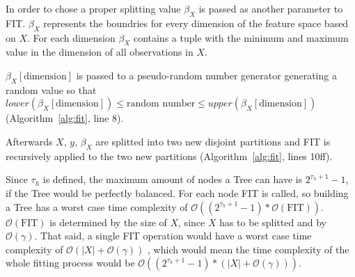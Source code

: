 In order to chose a proper splitting value $\beta_X$ is
passed as another parameter to FIT. $\beta_X$ represents
the boundries for every dimension of the feature space
based on $X$. For each dimension $\beta_X$ contains a
tuple with the minimum and maximum value in the dimension
of all observations in $X$.

$\beta_X[\text{dimension}]$ is passed to a pseudo-random
number generator generating a random value so that
$lower(\beta_X[\text{dimension}]) \leq \text{random number}
\leq upper(\beta_X[\text{dimension}])$
(Algorithm~\ref{alg:fit}, line 8).

Afterwards $X$, $y$, $\beta_X$ are splitted into two new
disjoint partitions and FIT is recursively applied to the
two new partitions (Algorithm~\ref{alg:fit}, lines 10ff).

Since $\tau_h$ is defined, the maximum amount of nodes a
Tree can have is $2^{\tau_h + 1} - 1$, if the Tree would
be perfectly balanced. For each node FIT is called, so
building a Tree has a worst case time complexity of
$\mathcal{O}((2^{\tau_h + 1} -1)*\mathcal{O}(\text{FIT}))$.
$\mathcal{O}(\text{FIT})$ is determined by the size of $X$,
since $X$ has to be splitted and by $\mathcal{O}(\gamma)$.
That said, a single FIT operation would have a worst case
time complexity of $\mathcal{O}(|X| + \mathcal{O}(\gamma))$
, which would mean the time complexity of the whole fitting
process would be $\mathcal{O}((2^{\tau_h + 1} - 1) *
(|X| + \mathcal{O}(\gamma)))$.

